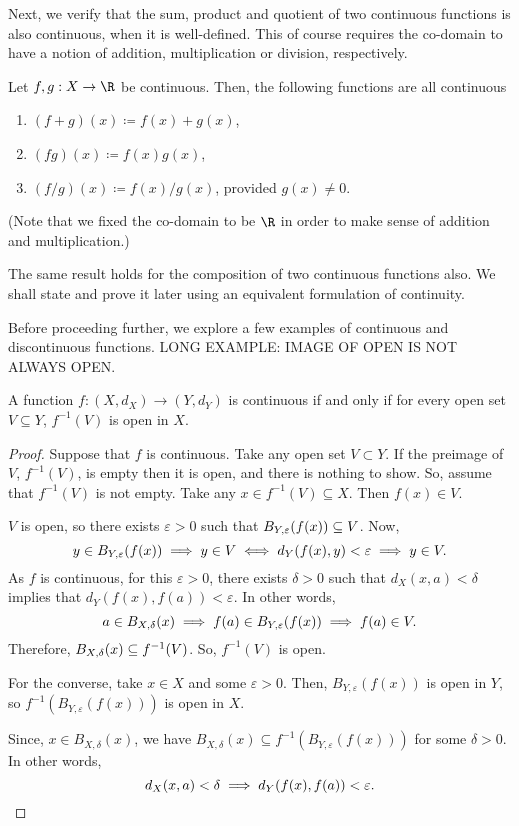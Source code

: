 Next, we verify that the sum, product and quotient of two continuous functions is also continuous, when it is well-defined. This of course requires the co-domain to have a notion of addition, multiplication or division, respectively.
\begin{nlemma}
  Let $f,g:X \to \R$ be continuous. Then, the following functions are all continuous
  \begin{enumerate}
  \item $(f+g)(x) \coloneq f(x) + g(x)$,
  \item $(fg)(x) \coloneq f(x)g(x)$,
  \item $(f/g)(x) \coloneq f(x)/g(x)$, provided $g(x) \neq 0$.
  \end{enumerate}
\end{nlemma}
(Note that we fixed the co-domain to be $\R$ in order to make sense of addition and multiplication.)

The same result holds for the composition of two continuous functions also. We shall state and prove it later using an equivalent formulation of continuity.

Before proceeding further, we explore a few examples of continuous and discontinuous functions. LONG EXAMPLE: IMAGE OF OPEN IS NOT ALWAYS OPEN.

\begin{nthm}
  A function $f:(X, d_X) \to (Y, d_Y)$ is continuous if and only if for every open set $V \subseteq Y$, $f^{-1}(V)$ is open in $X$.
\end{nthm}
\begin{proof}
  Suppose that $f$ is continuous. Take any open set $V \subset Y$. If the preimage of $V$, $f^{-1}(V)$, is empty then it is open, and there is nothing to show. So, assume that $f^{-1}(V)$ is not empty. Take any $x \in f^{-1}(V) \subseteq X$. Then $f(x) \in V$.

  $V$ is open, so there exists $\varepsilon > 0$ such that $B_{Y,\varepsilon}(f(x)) \subseteq V$. Now,
  \begin{equation*}
    y \in B_{Y,\varepsilon}(f(x)) \implies y \in V
    \iff d_{Y}(f(x),y) < \varepsilon \implies y \in V.
  \end{equation*}
  As $f$ is continuous, for this $\varepsilon>0$, there exists $\delta>0$ such that $d_{X}(x,a) < \delta$ implies that $d_{Y}(f(x),f(a))<\varepsilon$. In other words,
  \begin{equation*}
    a \in B_{X,\delta}(x) \implies f(a) \in B_{Y,\varepsilon}(f(x)) \implies f(a) \in V.
  \end{equation*}
  Therefore, $B_{X,\delta}(x) \subseteq f^{-1}(V)$. So, $f^{-1}(V)$ is open.

  For the converse, take $x \in X$ and some $\varepsilon>0$. Then, $B_{Y, \varepsilon}(f(x))$ is open in $Y$, so $f^{-1}(B_{Y, \varepsilon}(f(x)))$ is open in $X$.

  Since, $x \in B_{X,\delta}(x)$, we have $B_{X,\delta}(x) \subseteq f^{-1}(B_{Y, \varepsilon}(f(x)))$ for some $\delta>0$. In other words,
  \begin{equation*}
    d_{X}(x,a) < \delta \implies d_{Y}(f(x), f(a)) < \varepsilon.\qedhere
  \end{equation*}
\end{proof}

